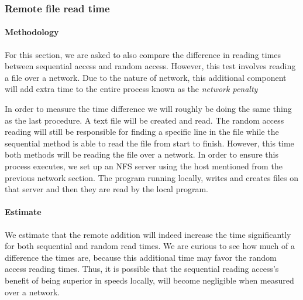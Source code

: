 \subsubsection{Remote file read time}


\paragraph{Methodology}

For this section, we are asked to also compare the difference in reading times between sequential access and random access. However, this test involves reading a file over a network. Due to the nature of network, this additional component will add extra time to the entire process known as the \emph{network penalty}

In order to measure the time difference we will roughly be doing the same thing as the last procedure. A text file will be created and read. The random access reading will still be responsible for finding a specific line in the file while the sequential method is able to read the file from start to finish. However, this time both methods will be reading the file over a network. In order to ensure this process executes, we set up an NFS server using the host mentioned from the previous network section. The program running locally, writes and creates files on that server and then they are read by the local program.

\paragraph{Estimate}

We estimate that the remote addition will indeed increase the time significantly for both sequential and random read times. We are curious to see how much of a difference the times are, because this additional time may favor the random access reading times. Thus, it is possible that the sequential reading access's benefit of being superior in speeds locally, will become negligible when measured over a network.

